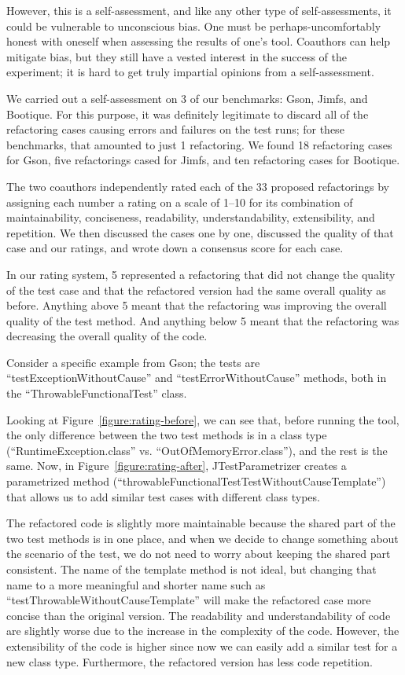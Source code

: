 However, this is a self-assessment, and like any other type of self-assessments, it could be vulnerable to unconscious bias. One must be perhaps-uncomfortably honest with oneself when assessing the results of one's tool. Coauthors can help mitigate bias, but they still have a vested interest in the success of the experiment; it is hard to get truly impartial opinions from a self-assessment.

We carried out a self-assessment on 3 of our benchmarks: Gson, Jimfs, and Bootique. For this purpose, it was definitely legitimate to discard all of the refactoring cases causing errors and failures on the test runs; for these benchmarks, that amounted to just 1 refactoring. We found 18 refactoring cases for Gson, five refactorings cased for Jimfs, and ten refactoring cases for Bootique.

The two coauthors independently rated each of the 33 proposed refactorings by assigning each number a rating on a scale of 1--10 for its combination of maintainability, conciseness, readability, understandability, extensibility, and repetition. We then discussed the cases one by one, discussed the quality of that case and our ratings, and wrote down a consensus score for each case.

In our rating system, 5 represented a refactoring that did not change the quality of the test case and that the refactored version had the same overall quality as before. Anything above 5 meant that the refactoring was improving the overall quality of the test method. And anything below 5 meant that the refactoring was decreasing the overall quality of the code.

Consider a specific example from Gson; the tests are ``testExceptionWithoutCause'' and ``testErrorWithoutCause'' methods, both in the ``ThrowableFunctionalTest'' class.

Looking at Figure~\ref{figure:rating-before}, we can see that, before running the tool, the only difference between the two test methods is in a class type (``RuntimeException.class'' vs. ``OutOfMemoryError.class''), and the rest is the same. Now, in Figure~\ref{figure:rating-after}, JTestParametrizer creates a parametrized method (``throwableFunctionalTestTestWithoutCauseTemplate'') that allows us to add similar test cases with different class types.

The refactored code is slightly more maintainable because the shared part of the two test methods is in one place, and when we decide to change something about the scenario of the test, we do not need to worry about keeping the shared part consistent.
The name of the template method is not ideal, but changing that name to a more meaningful and shorter name such as ``testThrowableWithoutCauseTemplate'' will make the refactored case more concise than the original version.
The readability and understandability of code are slightly worse due to the increase in the complexity of the code.
However, the extensibility of the code is higher since now we can easily add a similar test for a new class type. Furthermore, the refactored version has less code repetition.

